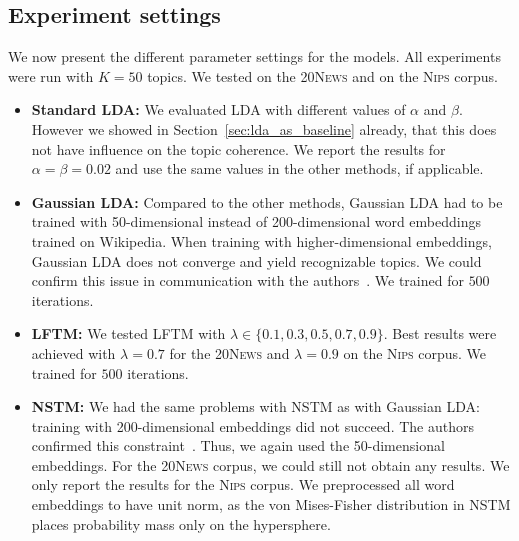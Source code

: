\documentclass[
        a4paper,
        titlepage,
        twoside,
        parskip,
        numbers=noenddot
        ]{scrbook}
\theoremstyle{break}
\begin{document}
\subsection{Experiment settings}
\label{sec:tc_experiment_settings}

We now present the different parameter settings for the models.
All experiments were run with $K = 50$ topics.
We tested on the \textsc{20News} and on the \textsc{Nips} corpus.

\begin{itemize}
  \item
    \textbf{Standard LDA:}
    We evaluated LDA with different values of $\alpha$ and $\beta$.
    However we showed in Section~\ref{sec:lda_as_baseline} already, that this does not have influence on the topic coherence.
    We report the results for $\alpha = \beta = 0.02$ and use the same values in the other methods, if applicable.
  \item
    \textbf{Gaussian LDA:}
    Compared to the other methods, Gaussian LDA had to be trained with 50-dimensional instead of 200-dimensional word embeddings trained on Wikipedia.
    When training with higher-dimensional embeddings, Gaussian LDA does not converge and yield recognizable topics.
    We could confirm this issue in communication with the authors~\cite{Das2016}.
    We trained for $500$ iterations.
  \item
    \textbf{LFTM:}
    We tested LFTM with $\lambda \in \{0.1, 0.3, 0.5, 0.7, 0.9 \}$.
    Best results were achieved with $\lambda = 0.7$ for the \textsc{20News} and $\lambda = 0.9$ on the \textsc{Nips} corpus.
    We trained for $500$ iterations.
  \item
    \textbf{NSTM:}
    We had the same problems with NSTM as with Gaussian LDA: training with 200-dimensional embeddings did not succeed.
    The authors confirmed this constraint~\cite{Saeedi2016}.
    Thus, we again used the 50-dimensional embeddings.
    For the \textsc{20News} corpus, we could still not obtain any results.
    We only report the results for the \textsc{Nips} corpus.
    We preprocessed all word embeddings to have unit norm, as the von Mises-Fisher distribution in NSTM places probability mass only on the hypersphere.

\end{itemize}
\end{document}
